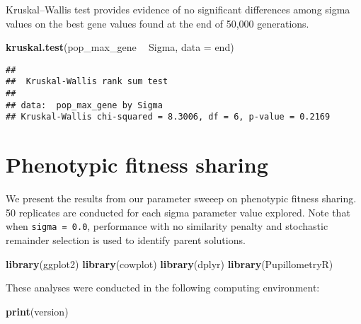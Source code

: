 \documentclass[]{book}
\newenvironment{Shaded}{\begin{snugshade}}{\end{snugshade}}
\newcommand{\DataTypeTok}[1]{\textcolor[rgb]{0.13,0.29,0.53}{#1}}
\newcommand{\KeywordTok}[1]{\textcolor[rgb]{0.13,0.29,0.53}{\textbf{#1}}}
\newcommand{\NormalTok}[1]{#1}
\newcommand{\OperatorTok}[1]{\textcolor[rgb]{0.81,0.36,0.00}{\textbf{#1}}}
\newcommand{\StringTok}[1]{\textcolor[rgb]{0.31,0.60,0.02}{#1}}
\begin{document}
Kruskal--Wallis test provides evidence of no significant differences among sigma values on the best gene values found at the end of 50,000 generations.

\begin{Shaded}
\begin{Highlighting}[]
\KeywordTok{kruskal.test}\NormalTok{(pop_max_gene }\OperatorTok{~}\StringTok{ }\NormalTok{Sigma, }\DataTypeTok{data =}\NormalTok{ end)}
\end{Highlighting}
\end{Shaded}

\begin{verbatim}
## 
##  Kruskal-Wallis rank sum test
## 
## data:  pop_max_gene by Sigma
## Kruskal-Wallis chi-squared = 8.3006, df = 6, p-value = 0.2169
\end{verbatim}

\hypertarget{phenotypic-fitness-sharing}{%
\chapter{Phenotypic fitness sharing}\label{phenotypic-fitness-sharing}}

We present the results from our parameter sweeep on phenotypic fitness sharing.
50 replicates are conducted for each sigma parameter value explored.
Note that when \texttt{sigma\ =\ 0.0}, performance with no similarity penalty and stochastic remainder selection is used to identify parent solutions.

\begin{Shaded}
\begin{Highlighting}[]
\KeywordTok{library}\NormalTok{(ggplot2)}
\KeywordTok{library}\NormalTok{(cowplot)}
\KeywordTok{library}\NormalTok{(dplyr)}
\KeywordTok{library}\NormalTok{(PupillometryR)}
\end{Highlighting}
\end{Shaded}

These analyses were conducted in the following computing environment:

\begin{Shaded}
\begin{Highlighting}[]
\KeywordTok{print}\NormalTok{(version)}
\end{Highlighting}
\end{Shaded}
\end{document}
